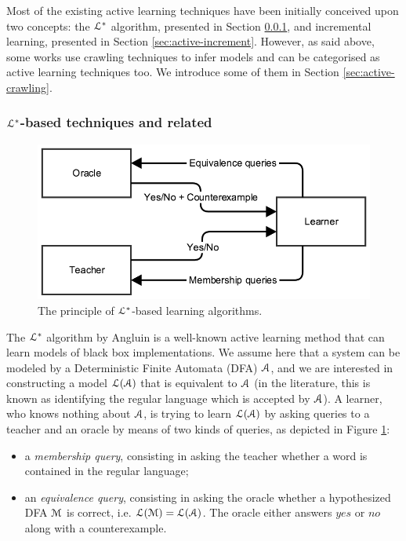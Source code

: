 Most of the existing active learning techniques have been
initially conceived upon two concepts: the $\EuScript{L}^*$
algorithm, presented in Section \ref{sec:active-letoile}, and
incremental learning, presented in Section
\ref{sec:active-increment}. However, as said above, some works
use crawling techniques to infer models and can be categorised as
active learning techniques too. We introduce some of them in
Section \ref{sec:active-crawling}.

\subsubsection{$\EuScript{L}^*$-based techniques and related}
\label{sec:active-letoile}

\begin{figure}[h]
    \begin{center}
        \includegraphics[width=0.9\linewidth]{figures/angluin.png}
    \end{center}

    \caption{The principle of $\EuScript{L}^*$-based learning
    algorithms.}
    \label{fig:angluin}
\end{figure}

The $\EuScript{L}^*$ algorithm by Angluin \cite{Angluin198787} is
a well-known active learning method that can learn models of
black box implementations. We assume here that a system can be
modeled by a Deterministic Finite Automata (DFA) $\EuScript{A}$,
and we are interested in constructing a model
$\EuScript{L}(\EuScript{A})$ that is equivalent to $\EuScript{A}$
(in the literature, this is known as identifying the regular
language which is accepted by $\EuScript{A}$). A learner, who
knows nothing about $\EuScript{A}$, is trying to learn
$\EuScript{L}(\EuScript{A})$ by asking queries to a teacher and
an oracle by means of two kinds of queries, as depicted in Figure
\ref{fig:angluin}:

\begin{itemize}
\item a \textit{membership query}, consisting in asking the
teacher whether a word is contained in the regular language;

\item an \textit{equivalence query}, consisting in asking the
oracle whether a hypothesized DFA $\EuScript{M}$ is correct, i.e.
$\EuScript{L}(\EuScript{M}) = \EuScript{L}(\EuScript{A})$.  The
oracle either answers $yes$ or $no$ along with a counterexample.
\end{itemize}

